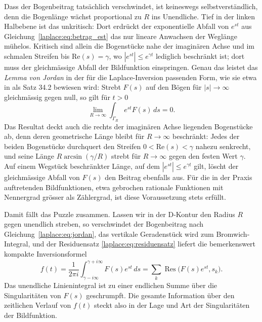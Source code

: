 

Dass der Bogenbeitrag tatsächlich verschwindet, ist keineswegs
selbstverständlich, denn die Bogenlänge wächst proportional zu $R$ ins
%
Unendliche.
Tief in der linken Halbebene ist das unkritisch:
Dort erdrückt der exponentielle Abfall von $e^{st}$ aus
Gleichung~\eqref{laplace:eq:betrag_est} das nur lineare Anwachsen der
Weglänge mühelos.
Kritisch sind allein die Bogenstücke nahe der imaginären Achse und im
schmalen Streifen bis $\text{Re}(s) = \gamma$, wo
$|e^{st}| \leq e^{\gamma t}$ lediglich beschränkt ist; dort muss der
gleichmässige Abfall der Bildfunktion einspringen.
Genau das leistet das \emph{Lemma von Jordan} in der für die
%
%
Laplace-Inversion passenden Form, wie sie etwa in
%
\cite{laplace:doetsch1961} als Satz 34.2 bewiesen wird:
Strebt $F(s)$ auf den Bögen für $|s| \to \infty$ gleichmässig gegen
null, so gilt für $t > 0$
\begin{equation}
    \lim_{R \to \infty} \int_{\Gamma_R} e^{st} F(s) \, ds
    =
    0.
    \label{laplace:eq:jordan}
\end{equation}
Das Resultat deckt auch die rechts der imaginären Achse liegenden
Bogenstücke ab, denn deren geometrische Länge bleibt für $R \to \infty$
beschränkt:
Jedes der beiden Bogenstücke durchquert den Streifen
$0 < \text{Re}(s) < \gamma$ nahezu senkrecht, und seine Länge
$R \arcsin(\gamma/R)$ strebt für $R \to \infty$ gegen den festen Wert
$\gamma$.
Auf einem Wegstück beschränkter Länge, auf dem $|e^{st}| \leq e^{\gamma t}$
gilt, löscht der gleichmässige Abfall von $F(s)$ den Beitrag ebenfalls
aus.
Für die in der Praxis auftretenden Bildfunktionen, etwa gebrochen rationale
Funktionen mit Nennergrad grösser als Zählergrad, ist diese Voraussetzung
stets erfüllt.

Damit fällt das Puzzle zusammen.
Lassen wir in der D-Kontur den Radius $R$ gegen unendlich streben, so
verschwindet der Bogenbeitrag nach
Gleichung~\eqref{laplace:eq:jordan}, das vertikale Geradenstück wird zum
Bromwich-Integral, und der Residuensatz
\eqref{laplace:eq:residuensatz} liefert die bemerkenswert kompakte
Inversionsformel
\begin{equation}
    f(t)
    =
    \frac{1}{2\pi i} \int_{\gamma - i\infty}^{\gamma + i\infty}
    F(s) e^{st} \, ds
    =
    \sum_{k} \operatorname{Res}\bigl(F(s) e^{st}, s_k\bigr).
    \label{laplace:eq:inversion_residuen}
\end{equation}
Das unendliche Linienintegral ist zu einer endlichen Summe über die
Singularitäten von $F(s)$ geschrumpft.
Die gesamte Information über den zeitlichen Verlauf von $f(t)$ steckt also
in der Lage und Art der Singularitäten der Bildfunktion.

